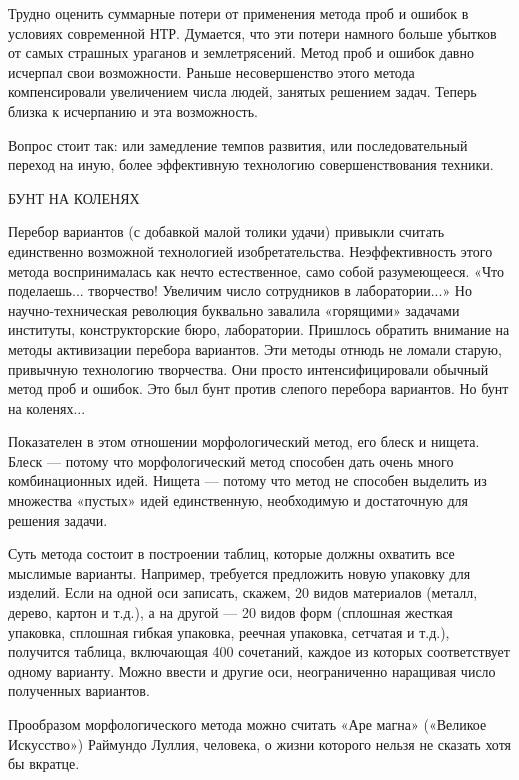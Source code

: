 Трудно оценить суммарные  потери от применения метода проб  и ошибок в
условиях  современной НТР.  Думается,  что эти  потери намного  больше
убытков  от самых  страшных  ураганов и  землетрясений.  Метод проб  и
ошибок давно  исчерпал свои  возможности. Раньше  несовершенство этого
метода компенсировали увеличением числа людей, занятых решением задач.
Теперь близка к исчерпанию и эта возможность.

Вопрос стоит так: или замедление темпов развития, или последовательный
переход  на  иную,   более  эффективную  технологию  совершенствования
техники.


БУНТ НА КОЛЕНЯХ


Перебор  вариантов (с  добавкой малой  толики удачи)  привыкли считать
единственно  возможной  технологией изобретательства.  Неэффективность
этого  метода  воспринималась  как   нечто  естественное,  само  собой
разумеющееся. «Что поделаешь... творчество! Увеличим число сотрудников
в лаборатории...»  Но научно-техническая революция  буквально завалила
«горящими»  задачами  институты,  конструкторские  бюро,  лаборатории.
Пришлось обратить  внимание на методы активизации  перебора вариантов.
Эти методы  отнюдь не ломали старую,  привычную технологию творчества.
Они просто интенсифицировали обычный метод проб и ошибок. Это был бунт
против слепого перебора вариантов. Но бунт на коленях...

Показателен  в  этом  отношении  морфологический метод,  его  блеск  и
нищета. Блеск —  потому что морфологический метод  способен дать очень
много  комбинационных идей.  Нищета  — потому  что  метод не  способен
выделить  из  множества  «пустых»  идей  единственную,  необходимую  и
достаточную для решения задачи.

Суть метода состоит  в построении таблиц, которые  должны охватить все
мыслимые варианты.  Например, требуется предложить новую  упаковку для
изделий.  Если на  одной  оси записать,  скажем,  20 видов  материалов
(металл, дерево, картон и т.д.), а на другой — 20 видов форм (сплошная
жесткая упаковка, сплошная гибкая упаковка, реечная упаковка, сетчатая
и  т.д.),  получится  таблица,  включающая 400  сочетаний,  каждое  из
которых  соответствует одному  варианту.  Можно ввести  и другие  оси,
неограниченно наращивая число полученных вариантов.

Прообразом морфологического метода можно считать «Аре магна» («Великое
Искусство»)  Раймундо Луллия,  человека,  о жизни  которого нельзя  не
сказать хотя бы вкратце.

